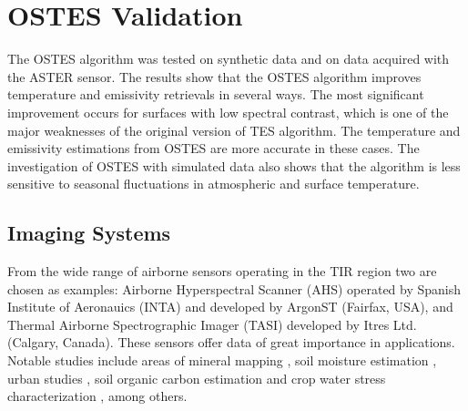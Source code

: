 \chapter{OSTES Validation}
\label{chap:OSTESValid}

The OSTES algorithm was tested on synthetic data and on data acquired with the ASTER sensor. The results show that the OSTES algorithm improves temperature and emissivity retrievals in several ways. The most significant improvement occurs for surfaces with low spectral contrast, which is one of the major weaknesses of the original version of TES algorithm. The temperature and emissivity estimations from OSTES are more accurate in these cases. The investigation of OSTES with simulated data also shows that the algorithm is less sensitive to seasonal fluctuations in atmospheric and surface temperature.

\section{Imaging Systems}

From the wide range of airborne sensors operating in the TIR region two are chosen as examples: Airborne Hyperspectral Scanner (AHS) operated by Spanish Institute of Aeronauics (INTA) and developed by ArgonST (Fairfax, USA), and Thermal Airborne Spectrographic Imager (TASI) developed by Itres Ltd. (Calgary, Canada). These sensors offer data of great importance in applications. Notable studies include areas of
mineral mapping \cite{NK14}, 
soil moisture estimation \cite{SF12}, 
urban studies \cite{SO12},
soil organic carbon estimation \cite{PC14} and
crop water stress characterization \cite{PP12},
among others.


